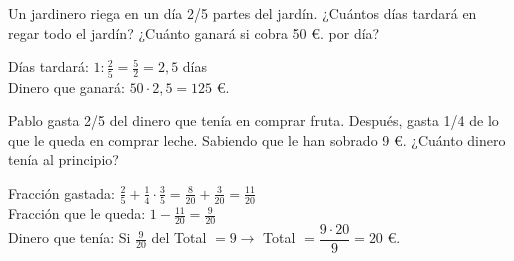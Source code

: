 \documentclass[addpoints,spanish, 12pt,a4paper]{exam}
\begin{document}
\begin{questions}
\addpoints

\question[2] Un jardinero riega en un día 2/5 partes del jardín. ¿Cuántos días tardará en regar todo el jardín? ¿Cuánto ganará si cobra 50 \euro. por día?
\begin{solution} Días tardará: $1:\frac{2}{5}=\frac{5}{2}=2,5$ días  \\
Dinero que ganará: $50\cdot2,5=125$ \euro. \end{solution}


\question[3] Pablo gasta 2/5 del dinero que tenía en comprar fruta. Después, gasta 1/4 de lo que le queda en comprar leche. Sabiendo que le han sobrado 9 \euro. ¿Cuánto dinero tenía al principio?
\begin{solution} Fracción gastada: $\frac{2}{5}+\frac{1}{4}\cdot\frac{3}{5}=\frac{8}{20}+\frac{3}{20}=\frac{11}{20}$  \\
Fracción que le queda: $1-\frac{11}{20}=\frac{9}{20}$ \\
Dinero que tenía: Si $\frac{9}{20}$ del Total $= 9\to$ Total $=\dfrac{9\cdot20}{9}=20$ \euro. \end{solution}

\addpoints


\end{questions}
\end{document}
